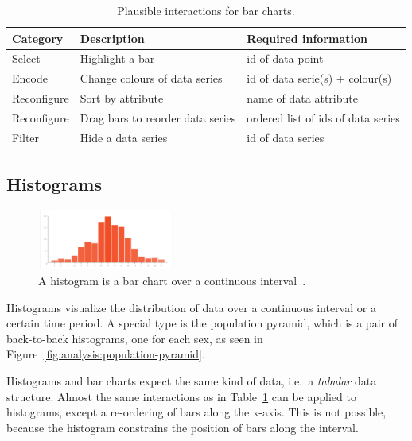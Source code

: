 \begin{table}[H]
  \centering
  \caption{Plausible interactions for bar charts.}
  \label{tab:analysis:bar-charts:interactions}
  \begin{tabular*}{\textwidth}{lll}
    \bf Category & \bf Description & \bf Required information \\
    \hline
    Select & Highlight a bar & id of data point \\
    Encode & Change colours of data series & id of data serie(s) + colour(s) \\
    Reconfigure & Sort by attribute & name of data attribute \\
    Reconfigure & Drag bars to reorder data series & ordered list of ids of data series \\
    Filter & Hide a data series & id of data series \\
  \end{tabular*}
\end{table}

\subsection{Histograms}

\begin{figure}
  \centering
  \label{fig:analysis:histograms}
  \caption{A histogram is a bar chart over a continuous interval~\parencite{VisualizationCatalogue2017}.}%
  \includegraphics[width=0.4\textwidth]{figures/analysis/histogram.png}%
\end{figure}

Histograms visualize the distribution of data over a continuous interval or a certain time period.
A special type is the population pyramid, which is a pair of back-to-back histograms, one for each sex, as seen in Figure~\ref{fig:analysis:population-pyramid}.

Histograms and bar charts expect the same kind of data, i.e.\ a \emph{tabular} data structure.
Almost the same interactions as in Table~\ref{tab:analysis:bar-charts:interactions} can be applied to histograms, except a re-ordering of bars along the x-axis.
This is not possible, because the histogram constrains the position of bars along the interval.

